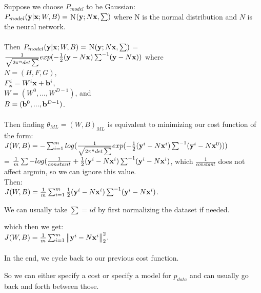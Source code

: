 \begin{example}
Suppose we choose $P_{model}$ to be Gaussian:\\
$P_{model}({\vy}|{\vx};W,B) =$ N$({\vy};N{\vx},\sum)$ where N is the normal distribution and $N$ is the neural network.\\
\\
Then $P_{model}({\vy}|{\vx};W,B) =$ N$({\vy};N{\vx},\sum)$ = $\frac{1}{\sqrt{2\pi^{n}det\sum}}exp(-\frac{1}{2}({\vy}-N{\vx})\sum^{-1}({\vy}-N{\vx}))$ where\\ $N = (H,F,G)$,\\ $F_{\vx}^{i} = W^{i}{\vx} + {\vb}^{i}$,\\ $W = (W^{0},...,W^{D-1})$, and\\ $B = ({\vb}^{0},...,{\vb}^{D-1})$.\\
\\
Then finding $\theta_{ML} = (W,B)_{ML}$ is equivalent to minimizing our cost function of the form:\\
$J(W,B) = -\sum_{i=1}^{m}log(\frac{1}{\sqrt{2\pi^{n}det\sum}}exp(-\frac{1}{2}({\vy}^{i}-N{\vx}^{i})\sum^{-1}({\vy}^{i}-N{\vx}^{0})))$\\
= $\frac{1}{m}\sum-log(\frac{1}{constant}+\frac{1}{2}({\vy}^{i}-N{\vx}^{i})\sum^{-1}({\vy}^{i}-N{\vx}^{i})$, which $\frac{1}{constant}$ does not affect argmin, so we can ignore this value.\\
Then:\\
$J(W,B) = \frac{1}{m}\sum_{i=1}^{m}\frac{1}{2}({\vy}^{i}-N{\vx}^{i})\sum^{-1}({\vy}^{i}-N{\vx}^{i})$.\\
    \begin{note}
        We can usually take $\sum = id$ by first normalizing the dataset if needed.
    \end{note}
which then we get:\\
$J(W,B) = \frac{1}{m}\sum_{i=1}^{m}\norm{{\vy}^{i}-N{\vx}^{i}}^{2}_{2}$.\\
\\
In the end, we cycle back to our previous cost function.\\
    \begin{note}
        So we can either specify a cost or specify a model for $p_{data}$ and can usually go back and forth between those.
    \end{note}
\end{example}
                     
     

